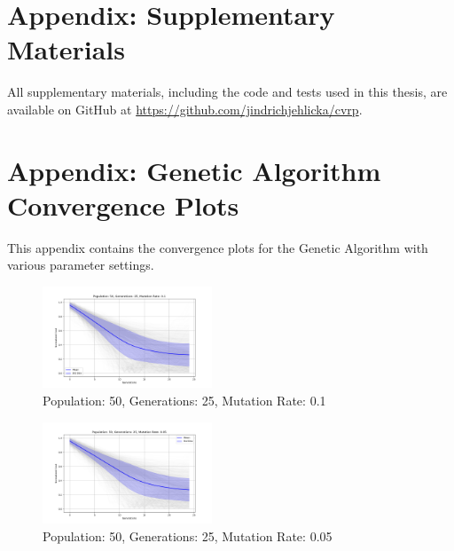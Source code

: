\documentclass{article}
\begin{document}
    \newpage



    
    \newpage

    \appendix


    \section{Appendix: Supplementary Materials}
    All supplementary materials, including the code and tests used in this thesis, are available on GitHub at \url{https://github.com/jindrichjehlicka/cvrp}.


    \section{Appendix: Genetic Algorithm Convergence Plots}

    This appendix contains the convergence plots for the Genetic Algorithm with various parameter settings.

    \begin{figure}[H]
        \centering
        \includegraphics[width=0.45\textwidth]{genetic_algorithm/appendix/Population_50_Generations_25_MutationRate_0.1}
        \caption{Population: 50, Generations: 25, Mutation Rate: 0.1}
        \label{fig:app_ga_50_25_1}
    \end{figure}

    \begin{figure}[H]
        \centering
        \includegraphics[width=0.45\textwidth]{genetic_algorithm/appendix/Population_50_Generations_25_MutationRate_0.05}
        \caption{Population: 50, Generations: 25, Mutation Rate: 0.05}
        \label{fig:app_ga_50_25_05}
    \end{figure}
\end{document}
